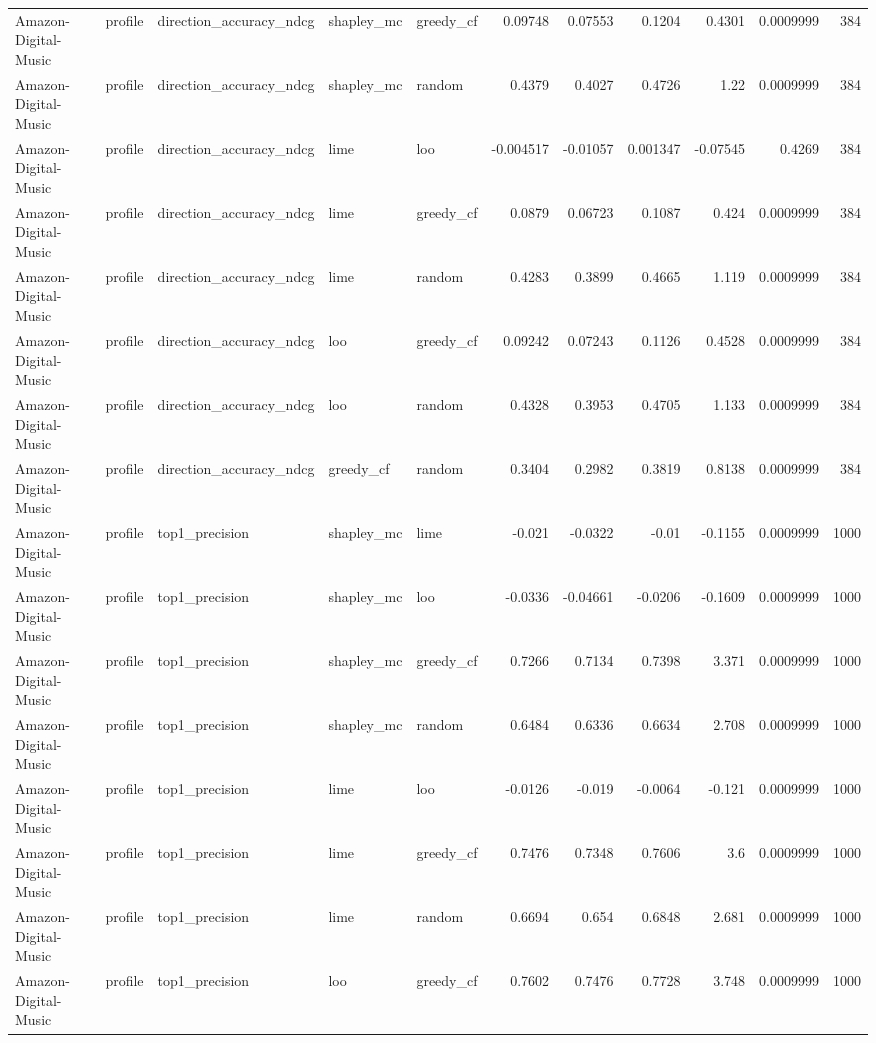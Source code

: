 \begin{table}[t]
\begin{tabular}{lllllrrrrrr}
Amazon-Digital-Music & profile & direction\_accuracy\_ndcg & shapley\_mc & greedy\_cf & 0.09748 & 0.07553 & 0.1204 & 0.4301 & 0.0009999 & 384 \\
Amazon-Digital-Music & profile & direction\_accuracy\_ndcg & shapley\_mc & random & 0.4379 & 0.4027 & 0.4726 & 1.22 & 0.0009999 & 384 \\
Amazon-Digital-Music & profile & direction\_accuracy\_ndcg & lime & loo & -0.004517 & -0.01057 & 0.001347 & -0.07545 & 0.4269 & 384 \\
Amazon-Digital-Music & profile & direction\_accuracy\_ndcg & lime & greedy\_cf & 0.0879 & 0.06723 & 0.1087 & 0.424 & 0.0009999 & 384 \\
Amazon-Digital-Music & profile & direction\_accuracy\_ndcg & lime & random & 0.4283 & 0.3899 & 0.4665 & 1.119 & 0.0009999 & 384 \\
Amazon-Digital-Music & profile & direction\_accuracy\_ndcg & loo & greedy\_cf & 0.09242 & 0.07243 & 0.1126 & 0.4528 & 0.0009999 & 384 \\
Amazon-Digital-Music & profile & direction\_accuracy\_ndcg & loo & random & 0.4328 & 0.3953 & 0.4705 & 1.133 & 0.0009999 & 384 \\
Amazon-Digital-Music & profile & direction\_accuracy\_ndcg & greedy\_cf & random & 0.3404 & 0.2982 & 0.3819 & 0.8138 & 0.0009999 & 384 \\
Amazon-Digital-Music & profile & top1\_precision & shapley\_mc & lime & -0.021 & -0.0322 & -0.01 & -0.1155 & 0.0009999 & 1000 \\
Amazon-Digital-Music & profile & top1\_precision & shapley\_mc & loo & -0.0336 & -0.04661 & -0.0206 & -0.1609 & 0.0009999 & 1000 \\
Amazon-Digital-Music & profile & top1\_precision & shapley\_mc & greedy\_cf & 0.7266 & 0.7134 & 0.7398 & 3.371 & 0.0009999 & 1000 \\
Amazon-Digital-Music & profile & top1\_precision & shapley\_mc & random & 0.6484 & 0.6336 & 0.6634 & 2.708 & 0.0009999 & 1000 \\
Amazon-Digital-Music & profile & top1\_precision & lime & loo & -0.0126 & -0.019 & -0.0064 & -0.121 & 0.0009999 & 1000 \\
Amazon-Digital-Music & profile & top1\_precision & lime & greedy\_cf & 0.7476 & 0.7348 & 0.7606 & 3.6 & 0.0009999 & 1000 \\
Amazon-Digital-Music & profile & top1\_precision & lime & random & 0.6694 & 0.654 & 0.6848 & 2.681 & 0.0009999 & 1000 \\
Amazon-Digital-Music & profile & top1\_precision & loo & greedy\_cf & 0.7602 & 0.7476 & 0.7728 & 3.748 & 0.0009999 & 1000 \\

\end{tabular}
\end{table}
